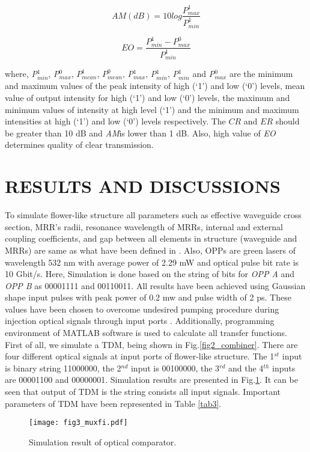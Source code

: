 \documentclass{osa-article}
\begin{document}
\begin{equation}
AM(dB)=10log\frac{P^1_{max}} {P^1_{min}}
\label{eq:3}
\end{equation}
 
\begin{equation}
EO=\frac{P^1_{min}-P^0_{max}} {P^1_{min}}
\label{eq:4}
\end{equation}

where, \textit {P$^1_{min}$}, \textit {P$^0_{max}$}, $P^1_{mean}$, $P^0_{mean}$,  \textit {P$^1_{max}$}, \textit {P$^1_{min}$}, \textit {P$^1_{min}$} and \textit {P$^0_{max}$} are the minimum and maximum values of the peak intensity of high (`1') and low (`0') levels, mean value of output intensity for high (`1') and low (`0') levels, the maximum and minimum values of intensity at high level (`1') and the minimum and maximum intensities at high (`1') and low (`0') levels respectively. The $CR$ and $ER$ should be greater than 10 dB and \textit{AM}is lower than 1 dB. Also, high value of \textit{EO} determines quality of clear transmission.

\section{RESULTS AND DISCUSSIONS }
\label{}

To simulate flower-like structure all parameters such as effective waveguide cross section, MRR’s radii, resonance wavelength of MRRs, internal and external coupling coefficients, and gap between all elements in structure (waveguide and MRRs)  are same as what have been defined in \cite{lalehsimulation}. Also, OPPs are green lasers of wavelength 532 nm with average power of 2.29 mW and optical pulse bit rate is 10 Gbit/s. Here, Simulation is done based on the string of bits for \textit{OPP A} and \textit{OPP B} as 00001111 and 00110011. All results have been achieved using Gaussian shape input pulses with peak power of 0.2 mw and pulse width of 2 ps. These values have been chosen to overcome undesired pumping procedure during injection optical signals through input ports \cite{lalehsimulation}. Additionally, programming environment of MATLAB software is used to calculate all transfer functions.
First of all, we simulate a TDM, being shown in Fig.\ref{fig2_combiner}. There are four different optical signals at input ports of flower-like structure. The 1$^{st}$ input is binary string 11000000, the 2$^{nd}$ input is 00100000, the 3$^{rd}$ and the 4$^{th}$ inputs are 00001100 and 00000001. Simulation results are presented in Fig.\ref{fig3_muxfi}. It can be seen that output of TDM is the string consists all input signals. Important parameters of TDM have been represented in Table \ref{tab3}.
\begin{figure}[tb]
\centering
\texttt{[image: fig3\_muxfi.pdf]}
	\caption{Simulation result of optical comparator.}
	\label{fig3_muxfi}
\end{figure}
\end{document}
